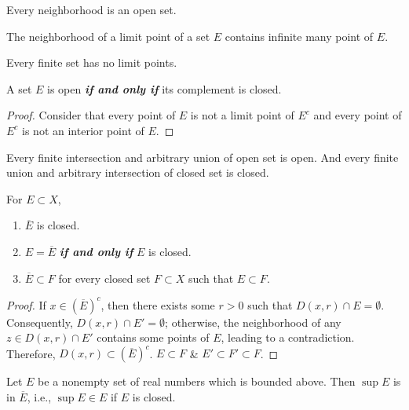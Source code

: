 \begin{theorem}[pma 2.19]
Every neighborhood is an open set.
\end{theorem}

\begin{theorem}
\label{thm:ball_of_limit_pt}
The neighborhood of a limit point of a set $E$ contains infinite many point of $E$.
\end{theorem}

\begin{corollary}[pma 2.20]
Every finite set has no limit points.
\end{corollary}

\begin{theorem}[pma 2.23]
A set $E$ is open \textbf{\emph{if and only if}} its complement is closed.
\end{theorem}
\begin{proof}
Consider that every point of $E$ is not a limit point of $E^c$ and every point of $E^c$ is not an interior point of $E$.
\end{proof}

\begin{theorem}[pma 2.24]
Every finite intersection and arbitrary union of open set is open. And every finite union and arbitrary intersection of closed set is closed.
\end{theorem}

\begin{theorem}[pma 2.27]
For $E\subset X$,
\begin{enumerate}[label={(\arabic*)}]
\item $\overline{E}$ is closed.
\item $E=\overline{E}$ \textbf{\emph{if and only if}} $E$ is closed.
\item $\overline{E}\subset F$ for every closed set $F\subset X$ such that $E\subset F$.
\end{enumerate}
\end{theorem}
\begin{proof}
 If $x\in (\overline{E})^c$, then there exists some $r>0$ such that $D(x,r)\cap E=\emptyset$. Consequently, $D(x,r)\cap E'=\emptyset$; otherwise, the neighborhood of any $z\in D(x,r)\cap E'$ contains some points of $E$, leading to a contradiction. Therefore, $D(x,r)\subset (\overline{E})^c$.
 $E\subset F$ \& $E'\subset F'\subset F$.
\end{proof}

\begin{theorem}[pma 2.28] \label{thm:sup_closed_set}
Let $E$ be a nonempty set of real numbers which is bounded above. Then $\sup E$ is in $\overline{E}$, i.e., $\sup E\in E$ if $E$ is closed.
\end{theorem}

